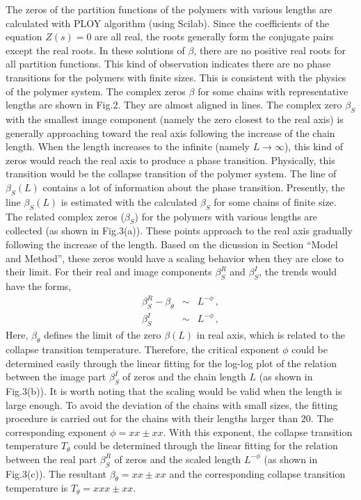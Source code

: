 \documentclass[preprint,preprintnumbers,amsmath,amssymb,showpacs,aps,pre]{revtex4-1}
\begin{document}
The zeros of the partition functions of the polymers with various lengths are
calculated with PLOY algorithm (using Scilab). Since the coefficients of the
equation $Z(s)=0$ are all real, the roots generally form the conjugate pairs
except the real roots. In these solutions of $\beta$, there are no positive
real roots for all partition functions. This kind of observation indicates
there are no phase transitions for the polymers with finite sizes. This is
consistent with the physics of the polymer system. The complex zeros $\beta$
for some chains with representative lengths are shown in Fig.2. They are
almost aligned in lines. The complex zero $\beta_S$ with the smallest image
component (namely the zero closest to the real axis) is generally approaching
toward the real axis following the increase of the chain length. When the
length increases to the infinite (namely $L\rightarrow\infty$), this kind of
zeros would reach the real axis to produce a phase transition. Physically,
this transition would be the collapse transition of the polymer system. The
line of $\beta_S(L)$ contains a lot of information about the phase transition.
Presently, the line $\beta_S(L)$ is estimated with the calculated $\beta_S$
for some chains of finite size. The related complex zeros ($\beta_S$) for the
polymers with various lengths are collected (as shown in Fig.3(a)). These
points approach to the real axis gradually following the increase of the
length. Based on the dicussion in Section ``Model and Method'', these zeros
would have a scaling behavior when they are close to their limit. For their
real and image components $\beta_S^R$ and $\beta_S^I$, the trends would have
the forms,
\begin{eqnarray}
\beta_S^R - \beta_{\theta}  &\sim&  L^{-\phi} \, , \\
\beta_S^I  &\sim&  L^{-\phi} \, ,
\end{eqnarray}
Here,
$\beta_{\theta}$ defines the limit of the zero $\beta(L)$ in real axis, which
is related to the collapse transition temperature. Therefore, the critical
exponent $\phi$ could be determined easily through the linear fitting for the
log-log plot of the relation between the image part $\beta_S^I$ of zeros and
the chain length $L$ (as shown in Fig.3(b)). It is worth noting that the
scaling would be valid when the length is large enough. To avoid the deviation
of the chains with small sizes, the fitting procedure is carried out for the
chains with their lengths larger than $20$. The corresponding exponent
$\phi=xx \pm xx$. With this exponent, the collapse transition temperature
$T_{\theta}$ could be determined through the linear fitting for the relation
between the real part $\beta_S^R$ of zeros and the scaled length $L^{-\phi}$
(as shown in Fig.3(c)). The resultant $\beta_{\theta}=xx \pm xx$ and the
corresponding collapse transition temperature is $T_{\theta}=xxx \pm xx$.
\end{document}
